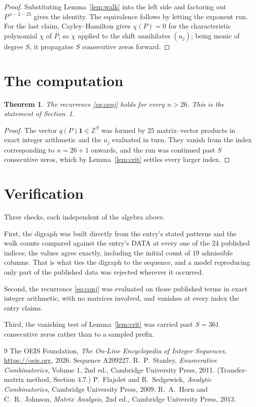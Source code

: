 \documentclass[11pt,a4paper]{article}
\theoremstyle{plain}
\newtheorem{theorem}{Theorem}
\theoremstyle{definition}
\begin{document}
\begin{proof}
Substituting Lemma~\ref{lem:walk} into the left side and factoring out
$P^{\,n-2-25}$ gives the identity. The equivalence follows by letting the exponent
run. For the last claim, Cayley--Hamilton gives $\chi(P)=0$ for the characteristic
polynomial $\chi$ of $P$, so $\chi$ applied to the shift annihilates $(u_j)$; being monic of
degree $S$, it propagates $S$ consecutive zeros forward.
\end{proof}

\section{The computation}

\begin{theorem}
The recurrence \eqref{eq:conj} holds for every $n>26$. This is the statement of
Section~1.
\end{theorem}

\begin{proof}
The vector $q(P)\mathbf{1}\in\mathbb{Z}^{S}$ was formed by $25$ matrix--vector
products in exact integer arithmetic and the $u_j$ evaluated in turn. They vanish from the
index corresponding to $n=26+1$ onwards, and the run was continued past $S$ consecutive
zeros, which by Lemma~\ref{lem:crit} settles every larger index.
\end{proof}

\section{Verification}

Three checks, each independent of the algebra above.

First, the digraph was built directly from the entry's stated patterns and the walk counts
compared against the entry's DATA at every one of the $24$ published indices; the
values agree exactly, including the initial count of $19$ admissible columns. That is
what ties the digraph to the sequence, and a model reproducing only part of the published
data was rejected wherever it occurred.

Second, the recurrence \eqref{eq:conj} was evaluated on those published terms in exact
integer arithmetic, with no matrices involved, and vanishes at every index the entry claims.

Third, the vanishing test of Lemma~\ref{lem:crit} was carried past $S=361$ consecutive
zeros rather than to a sampled prefix.

\begin{thebibliography}{9}
 The OEIS Foundation, \emph{The On-Line Encyclopedia of Integer
Sequences}, \url{https://oeis.org}, 2026. Sequence A209227.
 R.~P.~Stanley, \emph{Enumerative Combinatorics}, Volume 1, 2nd ed.,
Cambridge University Press, 2011. (Transfer-matrix method, Section 4.7.)
 P.~Flajolet and R.~Sedgewick, \emph{Analytic Combinatorics}, Cambridge
University Press, 2009.
 R.~A.~Horn and C.~R.~Johnson, \emph{Matrix Analysis}, 2nd ed., Cambridge
University Press, 2013.
\end{thebibliography}
\end{document}
